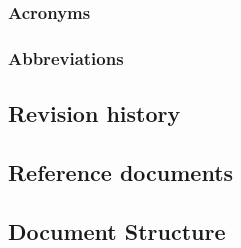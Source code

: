 	\subsubsection{Acronyms}
	\subsubsection{Abbreviations}
\subsection{Revision history}
\subsection{Reference documents}
\subsection{Document Structure}